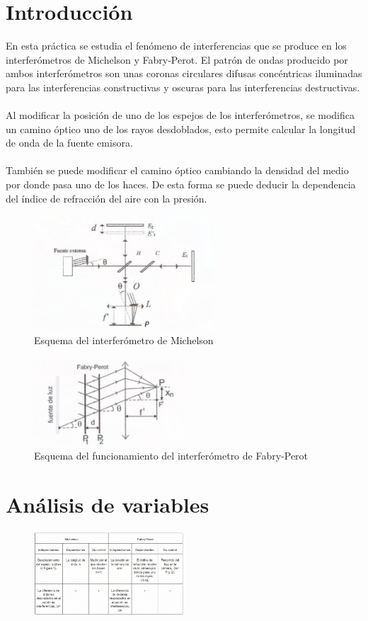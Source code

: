 \documentclass[11pt,letterpaper,twocolumn]{article}
\begin{document}
\section{Introducción}%
En esta práctica se estudia el fenómeno de interferencias que se produce en los interferómetros de Michelson y Fabry-Perot. El patrón de ondas producido por ambos interferómetros son unas coronas circulares difusas concéntricas iluminadas para las interferencias constructivas y oscuras para las interferencias destructivas. \\
\\
Al modificar la posición de uno de los espejos de los interferómetros, se modifica un camino óptico uno de los rayos desdoblados, esto permite calcular la longitud de onda de la fuente emisora. \\
\\
También se puede modificar el camino óptico cambiando la densidad del medio por donde pasa uno de los haces. De esta forma se puede deducir la dependencia del índice de refracción del aire con la presión.
\vfill\hfill 
\begin{figure}[H]
    \centering
    \includegraphics[width=0.6\textwidth]{img/int1.png}
    \caption{Esquema del interferómetro de Michelson}
    \label{fig:img-int1-png}
\end{figure}
\begin{figure}[H]
    \centering
    \includegraphics[width=0.5\textwidth]{img/int2.png}
    \caption{Esquema del funcionamiento del interferómetro de Fabry-Perot}
    \label{fig:img-int2-png}
\end{figure}
\section{Análisis de variables}%
\begin{figure}[H]
    \centering
    \includegraphics[width=0.5\textwidth]{img/variables.png}
    \label{fig:img-variables-png}
\end{figure}
\end{document}
